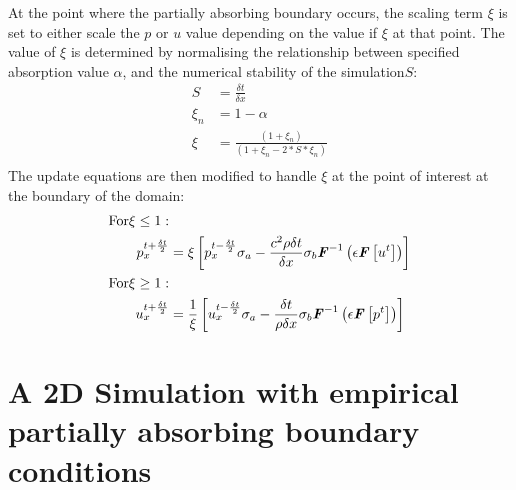 At the point where the partially absorbing boundary occurs, the scaling term $\xi$ is set to either scale the $p$ or $u$ value depending on the value if $\xi$ at that point. The value of $\xi$ is determined by normalising the relationship between specified absorption value $\alpha$, and the numerical stability of the simulation$S$:\\
\begin{equation}
\begin{aligned}
S & = \frac{\delta t}{\delta x} \\
\xi_n & = 1 - \alpha \\
\xi & = \frac{(1 + \xi_n)}{(1 + \xi_n - 2 * S * \xi_n)}\\
\end{aligned}
\end{equation}
The update equations are then modified to handle $\xi$ at the point of interest at the boundary of the domain:\\
\begin{equation}
\begin{aligned}
\textrm{For} \xi \leq 1: & \\
p^{t + \frac{\delta t}{2}}_{x} &= \xi \left[ p^{t - \frac{\delta t}{2}}_{x} \sigma_a - \frac{c^2 \rho \delta t}{\delta x} \sigma_b \textbf{\textit{F}}^{-1}\left( \epsilon \textbf{\textit{F}} \left[ u^{t} \right] \right) \right] \\
\textrm{For} \xi \geq 1: & \\
u^{t + \frac{\delta t}{2}}_{x} &= \frac{1}{\xi} \left[ u^{t - \frac{\delta t}{2}}_{x} \sigma_a - \frac{\delta t}{\rho \delta x} \sigma_b \textbf{\textit{F}}^{-1}\left(\epsilon \textbf{\textit{F}}\left[p^{t}\right] \right) \right] \\
\end{aligned}
\end{equation}

\section{A 2D Simulation with empirical partially absorbing boundary conditions}
\label{sec:3}

